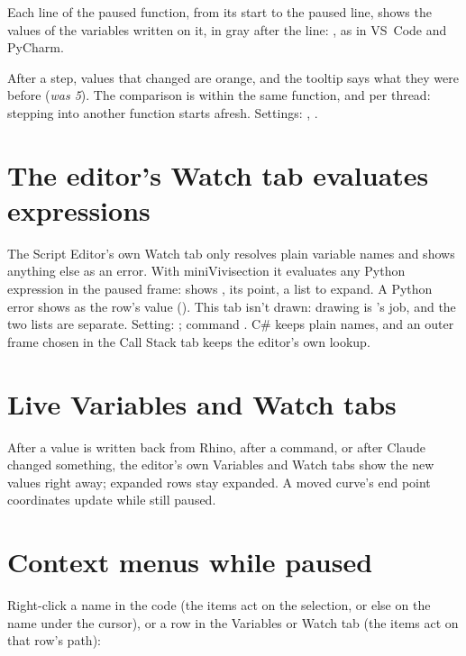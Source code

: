 Each line of the paused function, from its start to the paused line, shows the values of the variables
written on it, in gray after the line: , as in VS~Code and PyCharm.

After a step, values that changed are orange, and the tooltip says what they were before
(\emph{was 5}). The comparison is within the same function, and per thread: stepping into another
function starts afresh. Settings: ,
.

\section{The editor's Watch tab evaluates expressions}\label{sec:watchtab}

The Script Editor's own Watch tab only resolves plain variable names and shows anything else as an
error. With miniVivisection it evaluates any Python expression in the paused frame:  shows
,  its point,  a list to expand. A Python
error shows as the row's value (). This tab isn't drawn: drawing is
's job, and the two lists are separate. Setting: ;
command . C\# keeps plain names, and an outer frame chosen in the
Call Stack tab keeps the editor's own lookup.

\section{Live Variables and Watch tabs}

After a value is written back from Rhino, after a  command, or after Claude changed
something, the editor's own Variables and Watch tabs show the new values right away; expanded rows stay
expanded. A moved curve's end point coordinates update while still paused.

\section{Context menus while paused}\label{sec:contextmenus}

Right-click a name in the code (the items act on the selection, or else on the name under the cursor),
or a row in the Variables or Watch tab (the items act on that row's path):

